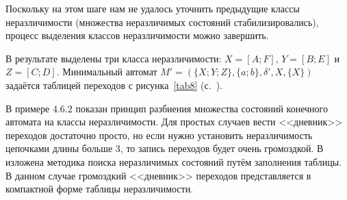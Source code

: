 \begin{myexample}
\begin{itemize}
Поскольку на этом шаге нам не удалось уточнить предыдущие классы неразличимости (множества неразличимых состояний стабилизировались), процесс выделения классов неразличимости можно завершить.



В результате выделены три класса неразличимости: $X = [A;F]$, $Y = [B;E]$ и $Z = [C;D]$. Минимальный автомат $M' = (\{X;Y;Z\},\{a;b\},\delta',X,\{X\})$ задаётся таблицей переходов с рисунка~\ref{tab8} (с.~\pageref{tab8}).
\end{itemize}
\end{myexample}

В примере $4.6.2$ показан принцип разбиения множества состояний 
конечного автомата на классы неразличимости. Для простых случаев вести 
<<дневник>> переходов достаточно просто, но если нужно установить 
неразличимость цепочками длины больше $3$, то запись переходов будет 
очень громоздкой. В \cite{Hop} изложена методика поиска неразличимых 
состояний путём заполнения таблицы. В данном случае громоздкий 
<<дневник>> переходов представляется в компактной форме таблицы 
неразличимости.

